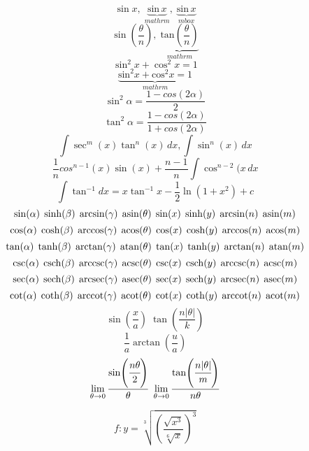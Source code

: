 \documentclass[12pt]{article}
\begin{document}
\setlength{\parindent}{0pt}

\[ \sin x ,\; \underbrace{\mathrm{sin}\,x}_{mathrm},\; \underbrace{\mbox{sin}\, x}_{mbox} \]
\[ \sin\!\left(\frac{\theta}{n}\right),\; \underbrace{\mathrm{tan}\!\left(\frac{\theta}{n}\right)}_{mathrm} \]
\[ \sin^2\!x + \cos^2 \!x = 1 \]
\[ \underbrace{\mathrm{sin}^2 x + \mathrm{cos}^2 x = 1 }_{mathrm} \]
\vspace{1em}
\[ \sin^2\alpha = \frac{1-cos(2\alpha)}{2} \]
\[ \tan^2\alpha = \frac{1-cos(2\alpha)}{1+cos(2\alpha)} \]
\[ \int \sec^m(x) \tan^n(x)\,dx, \int \sin^n(x)\,dx \]
\[ \frac{1}{n}cos^{n-1}(x)\sin(x) + \frac{n-1}{n}\int \cos^{n-2}(x\,dx \]
\[ \int\tan^{-1}dx=x\tan^{-1}x-\frac{1}{2}\ln\left(1+x^2\right) +c \]  
\vspace{1em}
\[ \sin(\alpha)\; \sinh(\beta)\;\arcsin(\gamma)\;\asin(\theta)\;\sine(x)\;\hypsine(y)\;\arcsine(n)\;\asine(m)\]
\[ \cos(\alpha)\;\cosh(\beta)\;\arccos(\gamma)\;\acos(\theta)\;\cosine(x)\;\hypcosine(y)\;\arccosine(n)\;\acosine(m) \]
\[ \tan(\alpha)\;\tanh(\beta)\;\arctan(\gamma)\;\atan(\theta)\;\tangent(x)\;\hyptangent(y)\;\arctangent(n)\;\atangent(m) \]
\[ \csc(\alpha)\;\csch(\beta)\;\arccsc(\gamma)\;\acsc(\theta)\;\cosecant(x)\;\hypcosecant(y)\;\arccosecant(n)\;\acosecant(m) \]
\[ \sec(\alpha)\;\sech(\beta)\;\arcsec(\gamma)\;\asec(\theta)\;\secant(x)\;\hypsecant(y)\;\arcsecant(n)\;\asecant(m) \]
\[ \cot(\alpha)\;\coth(\beta)\;\arccot(\gamma)\;\acot(\theta)\;\cotangent(x)\;\hypcotangent(y)\;\arccotangent(n)\;\acotangent(m) \]
\vspace{1em}
\[ \sin(\frac{x}{a})\;\tan(\frac{n|\theta|}{k})\]
\[ \frac{1}{a}\arctan(\frac{u}{a})\]
\[ \lim_{\theta \to 0}\frac{\sin(\cfrac{n\theta}{2})}{\theta}\;\lim_{\theta \to 0}\frac{\tan(\cfrac{n|\theta|}{m})}{n\theta}\]

\newpage

\begin{equation*}
f: y = \sqrt[3]{\left(\dfrac{\sqrt{x^3}}{\sqrt[6]{x}}\right)^3}
\end{equation*}
\end{document}
